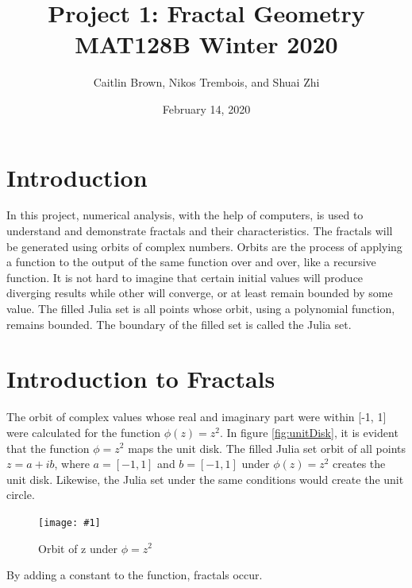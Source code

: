 \documentclass[letterpaper,11pt]{article}
\newcommand{\Figure}[3]{
\begin{figure}[h]
\begin{center}
\texttt{[image: \#1]}
\caption{#2}
\label{fig:#3}
\end{center}
\end{figure}
}
\begin{document}
\title{Project 1: Fractal Geometry \\ 
		\large MAT128B Winter 2020}
\author{Caitlin Brown, Nikos Trembois, and Shuai Zhi}
\date{February 14, 2020}
\maketitle
\tableofcontents
\newpage

\section{Introduction}
In this project, numerical analysis, with the help of computers, is used to understand and demonstrate fractals and their characteristics. The fractals will be generated using orbits of complex numbers. Orbits are the process of applying a function to the output of the same function over and over, like a recursive function. It is not hard to imagine that certain initial values will produce diverging results while other will converge, or at least remain bounded by some value. The filled Julia set is all points whose orbit, using a polynomial function, remains bounded. The boundary of the filled set is called the Julia set.

\section{Introduction to Fractals}
The orbit of complex values whose real and imaginary part were within [-1, 1] were calculated for the function $\phi(z) = z^2$. In figure \ref{fig:unitDisk}, it is evident that the function $\phi = z^2$ maps the unit disk. The filled Julia set orbit of all points $z = a + ib$, where $a = [-1,1]$ and $b = [-1,1]$ under $\phi(z) = z^2$ creates the unit disk. Likewise, the Julia set under the same conditions would create the unit circle. 

\Figure{../Figures/UnitDisk.png}{Orbit of z under $\phi=z^2$}{fig:unitDisk}

By adding a constant to the function, fractals occur. 
\end{document}
